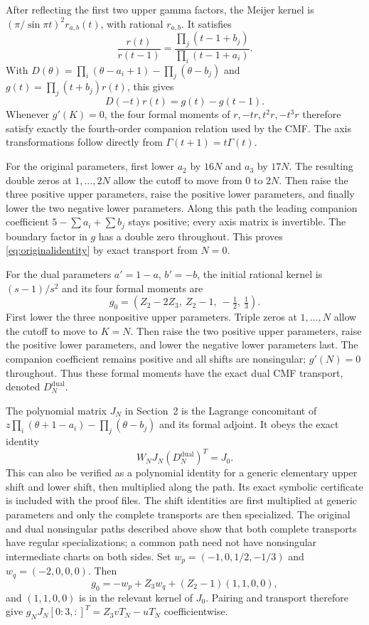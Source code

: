 \documentclass[11pt]{article}
\begin{document}
After reflecting the first two upper gamma factors, the Meijer kernel is
$(\pi/\sin\pi t)^2r_{a,b}(t)$, with rational $r_{a,b}$. It satisfies
\[
 \frac{r(t)}{r(t-1)}=
 \frac{\prod_j(t-1+b_j)}{\prod_i(t-1+a_i)}.
\]
With $D(\theta)=\prod_i(\theta-a_i+1)-\prod_j(\theta-b_j)$ and
$g(t)=\prod_j(t+b_j)r(t)$, this gives
\[
 D(-t)r(t)=g(t)-g(t-1).
\]
Whenever $g'(K)=0$, the four formal moments of $r,-tr,t^2r,-t^3r$
therefore satisfy exactly the fourth-order companion relation used by the
CMF. The axis transformations follow directly from $\Gamma(t+1)=t\Gamma(t)$.

For the original parameters, first lower $a_2$ by $16N$ and $a_3$ by $17N$.
The resulting double zeros at $1,\ldots,2N$ allow the cutoff to move from
$0$ to $2N$. Then raise the three positive upper parameters, raise the
positive lower parameters, and finally lower the two negative lower
parameters. Along this path the leading companion coefficient
$5-\sum a_i+\sum b_j$ stays positive; every axis matrix is invertible.
The boundary factor in $g$ has a double zero throughout. This proves
\eqref{eq:originalidentity} by exact transport from $N=0$.

For the dual parameters $a'=1-a$, $b'=-b$, the initial rational kernel is
$(s-1)/s^2$ and its four formal moments are
\[
 g_0=(Z_2-2Z_3,\ Z_2-1,\ -\tfrac12,\ \tfrac13).
\]
First lower the three nonpositive upper parameters. Triple zeros at
$1,\ldots,N$ allow the cutoff to move to $K=N$. Then raise the two positive
upper parameters, raise the positive lower parameters, and lower the
negative lower parameters last. The companion coefficient remains positive
and all shifts are nonsingular; $g'(N)=0$ throughout. Thus these formal
moments have the exact dual CMF transport, denoted $D_N^{\mathrm{dual}}$.

The polynomial matrix $J_N$ in Section~2 is the Lagrange concomitant of
$z\prod_i(\theta+1-a_i)-\prod_j(\theta-b_j)$ and its formal adjoint. It obeys
the exact identity
\[
 W_NJ_N(D_N^{\mathrm{dual}})^T=J_0.
\]
This can also be verified as a polynomial identity for a generic elementary
upper shift and lower shift, then multiplied along the path. Its exact
symbolic certificate is included with the proof files. The shift identities
are first multiplied at generic parameters and only the complete transports
are then specialized. The original and dual nonsingular paths described
above show that both complete transports have regular specializations;
a common path need not have nonsingular intermediate charts on both sides.
Set $w_p=(-1,0,1/2,-1/3)$ and $w_q=(-2,0,0,0)$. Then
\[
 g_0=-w_p+Z_3w_q+(Z_2-1)(1,1,0,0),
\]
and $(1,1,0,0)$ is in the relevant kernel of $J_0$. Pairing and transport
therefore give $g_NJ_N[0\!:\!3,:]^T=Z_3vT_N-uT_N$ coefficientwise.
\end{document}
